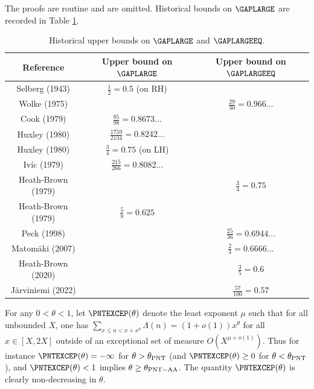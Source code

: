 The proofs are routine and are omitted.  Historical bounds on $\GAPLARGE$ are recorded in Table \ref{gaplarge-table}.

\begin{table}[ht]
    \caption{Historical upper bounds on $\GAPLARGE$ and $\GAPLARGEEQ$.}
    \label{gaplarge-table}
    \centering
    \renewcommand{\arraystretch}{1.2}
    \begin{tabular}{|c|c|c|}
    \hline
    Reference & Upper bound on $\GAPLARGE$ & Upper bound on $\GAPLARGEEQ$\\
    \hline
    Selberg (1943) \cite{selberg_1943} & $\frac{1}{2}=0.5$ (on RH) & \\
    \hline
    Wolke (1975) \cite{wolke_1975} & & $\frac{29}{30} = 0.966\dots$ \\
    \hline
    Cook (1979) \cite{cook_1979} & $\frac{85}{98} = 0.8673\dots$ & \\
    \hline
    Huxley (1980) \cite{huxley_large_1980} & $\frac{1759}{2134} = 0.8242\dots$ & \\
    \hline
    Huxley (1980) \cite{huxley_large_1980} & $\frac{3}{4} = 0.75$ (on LH) & \\
    \hline
    Iv\'ic (1979) \cite{ivic_sums_1979} & $\frac{215}{266} = 0.8082\dots$ & \\
    \hline
    Heath-Brown (1979) \cite{heath_brown_consecutive_III} & & $\frac{3}{4} = 0.75$ \\
    \hline
    Heath-Brown (1979) \cite{heath_brown_consecutive_II} & $\frac{5}{8} = 0.625$ & \\
    \hline
    Peck (1998) \cite{peck_differences_1998} & & $\frac{25}{36} = 0.6944\ldots$ \\
    \hline
    Matom\"{a}ki (2007) \cite{matomaki_large_2007} & & $\frac{2}{3} = 0.6666\ldots$ \\
    \hline
    Heath-Brown (2020) \cite{heath-brown_differences_2021} & & $\frac{3}{5} = 0.6$\\
    \hline
    J\"{a}rviniemi (2022) \cite{jarviniemi_large_2022} & & $\frac{57}{100} = 0.57$\\
    \hline
    \end{tabular}
\end{table}

For any $0 < \theta < 1$, let $\PNTEXCEP(\theta)$ denote the least exponent $\mu$ such that for all unbounded $X$, one has $\sum_{x \leq n < x + x^\theta} \Lambda(n) = (1+o(1)) x^\theta$ for all $x \in [X,2X]$ outside of an exceptional set of measure $O(X^{\mu+o(1)})$.  Thus for instance $\PNTEXCEP(\theta)=-\infty$ for $\theta > \theta_{\mathrm{PNT}}$ (and $\PNTEXCEP(\theta) \geq 0$ for $\theta < \theta_{\mathrm{PNT}}$), and $\PNTEXCEP(\theta) < 1$ implies $\theta \geq \theta_{\mathrm{PNT-AA}}$. The quantity $\PNTEXCEP(\theta)$ is clearly non-decreasing in $\theta$.

